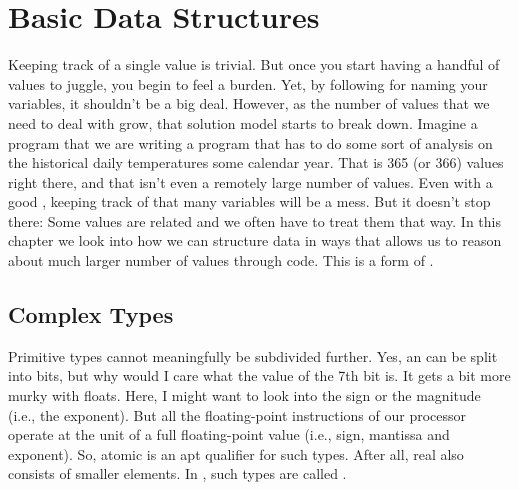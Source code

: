\chapter{Basic Data Structures}
\label{sec:primdata}

Keeping track of a single value is trivial. But once you start having a handful of values to juggle, you begin to feel a burden. Yet, by following  for naming your variables, it shouldn't be a big deal. However, as the number of values that we need to deal with grow, that solution model starts to break down. Imagine a program that we are writing a program that has to do some sort of analysis on the historical daily temperatures some calendar year. That is 365 (or 366) values right there, and that isn't even a remotely large number of values. Even with a good , keeping track of that many variables will be a mess. But it doesn't stop there: Some values are related and we often have to treat them that way. In this chapter we look into how we can structure data in ways that allows us to reason about much larger number of values through code. This is a form of .

\section{Complex Types}

Primitive types cannot meaningfully be subdivided further. Yes, an  can be split into bits, but why would I care what the value of the 7th bit is. It gets a bit more murky with floats. Here, I might want to look into the sign or the magnitude (i.e., the exponent). But all the floating-point instructions of our processor operate at the unit of a full floating-point value (i.e., sign, mantissa and exponent). So, atomic is an apt qualifier for such types. After all, real  also consists of smaller elements. In \csharp, such types are called .

